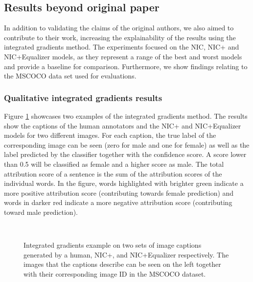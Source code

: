 \subsection{Results beyond original paper}

In addition to validating the claims of the original authors, we also aimed to
contribute to their work, increasing the explainability of the results using the integrated gradients 
method. The experiments focused on the NIC, NIC+ and NIC+Equalizer models, as they 
represent a range of the best and worst models and provide a baseline for comparison.
Furthermore, we show findings relating to the MSCOCO data set used for evaluations.

\subsubsection{Qualitative integrated gradients results}
Figure \ref{fig:integrated:grads:qualitative} showcases two examples of the integrated gradients method. The results show the captions of the human annotators and the NIC+ and NIC+Equalizer models for two different images. For each caption, the true label of the corresponding image can be seen (zero for male and one for female) as well as the label predicted by the classifier together with the confidence score. A score lower than 0.5 will be classified as female and a higher score as male. The total attribution score of a sentence is the sum of the attribution scores of the individual words. In the figure, words highlighted with brighter green indicate a more positive attribution score (contributing towards female prediction) and words in darker red indicate a more negative attribution score (contributing toward male prediction).
\begin{figure}[H]%
    \centering
    \qquad
    \\
    \addtocounter{subfigure}{-1}
    \qquad
    \caption{Integrated gradients example on two sets of image captions generated by a human, NIC+, and NIC+Equalizer respectively. The images that the captions describe can be seen on the left together with their corresponding image ID in the MSCOCO dataset.}%
    \label{fig:integrated:grads:qualitative}%
\end{figure}
